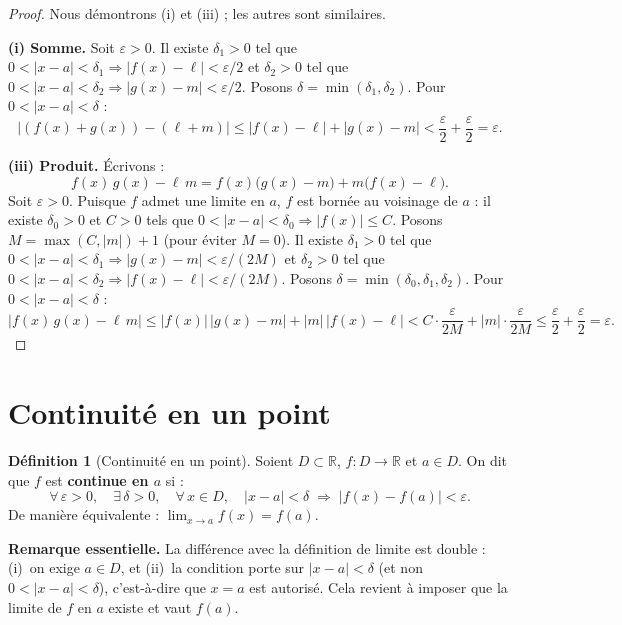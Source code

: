 \documentclass[12pt,a4paper,openany]{book}
\theoremstyle{definition}
\newtheorem{definition}{Définition}[chapter]
\newcommand{\R}{\mathbb{R}}
\begin{document}
\begin{proof}
Nous démontrons (i) et (iii) ; les autres sont similaires.

\textbf{(i) Somme.} Soit $\varepsilon > 0$. Il existe $\delta_1 > 0$ tel que $0 < |x - a| < \delta_1 \Rightarrow |f(x) - \ell| < \varepsilon/2$ et $\delta_2 > 0$ tel que $0 < |x - a| < \delta_2 \Rightarrow |g(x) - m| < \varepsilon/2$. Posons $\delta = \min(\delta_1, \delta_2)$. Pour $0 < |x - a| < \delta$ :
\[
  |(f(x) + g(x)) - (\ell + m)| \leqslant |f(x) - \ell| + |g(x) - m|
  < \frac{\varepsilon}{2} + \frac{\varepsilon}{2} = \varepsilon.
\]

\textbf{(iii) Produit.} Écrivons :
\[
  f(x)\,g(x) - \ell\, m = f(x)\bigl(g(x) - m\bigr) + m\bigl(f(x) - \ell\bigr).
\]
Soit $\varepsilon > 0$. Puisque $f$ admet une limite en $a$, $f$ est bornée au voisinage de $a$ : il existe $\delta_0 > 0$ et $C > 0$ tels que $0 < |x-a| < \delta_0 \Rightarrow |f(x)| \leqslant C$. Posons $M = \max(C, |m|) + 1$ (pour éviter $M = 0$). Il existe $\delta_1 > 0$ tel que $0 < |x-a| < \delta_1 \Rightarrow |g(x) - m| < \varepsilon/(2M)$ et $\delta_2 > 0$ tel que $0 < |x-a| < \delta_2 \Rightarrow |f(x) - \ell| < \varepsilon/(2M)$. Posons $\delta = \min(\delta_0, \delta_1, \delta_2)$. Pour $0 < |x-a| < \delta$ :
\[
  |f(x)\,g(x) - \ell\, m|
  \leqslant |f(x)|\,|g(x) - m| + |m|\,|f(x) - \ell|
  < C \cdot \frac{\varepsilon}{2M} + |m| \cdot \frac{\varepsilon}{2M}
  \leqslant \frac{\varepsilon}{2} + \frac{\varepsilon}{2} = \varepsilon.
\]
\end{proof}

\section{Continuité en un point}\label{sec:continuite-point}

\begin{definition}[Continuité en un point]\label{def:continuite-point}
Soient $D \subset \R$, $f \colon D \to \R$ et $a \in D$. On dit que $f$ est \textbf{continue en $a$} si :
\[
  \forall\, \varepsilon > 0,\quad \exists\, \delta > 0,\quad
  \forall\, x \in D,\quad |x - a| < \delta \;\Longrightarrow\; |f(x) - f(a)| < \varepsilon.
\]
De manière équivalente : $\lim_{x \to a} f(x) = f(a)$.

\medskip
\textbf{Remarque essentielle.} La différence avec la définition de limite est double : (i)~on exige $a \in D$, et (ii)~la condition porte sur $|x - a| < \delta$ (et non $0 < |x - a| < \delta$), c'est-à-dire que $x = a$ est autorisé. Cela revient à imposer que la limite de $f$ en $a$ existe et vaut $f(a)$.
\end{definition}
\end{document}
